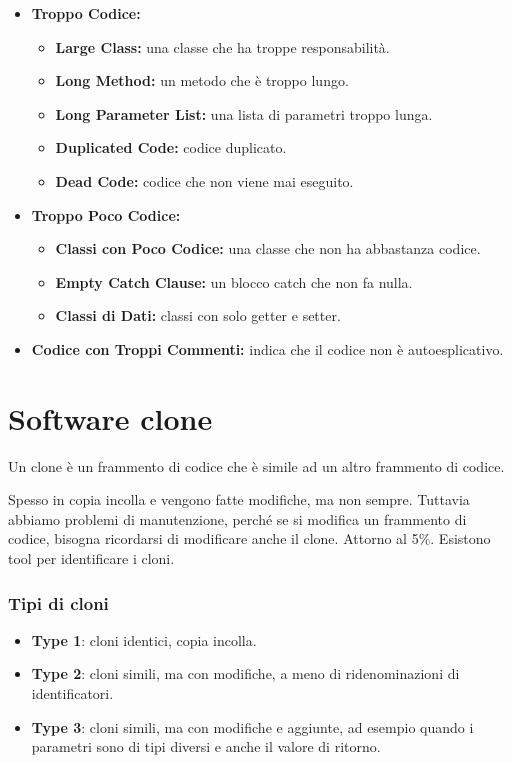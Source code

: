 \begin{itemize}
    \item \textbf{Troppo Codice:}
    \begin{itemize}
        \item \textbf{Large Class:} una classe che ha troppe responsabilità.
        \item \textbf{Long Method:} un metodo che è troppo lungo.
        \item \textbf{Long Parameter List:} una lista di parametri troppo lunga.
        \item \textbf{Duplicated Code:} codice duplicato.
        \item \textbf{Dead Code:} codice che non viene mai eseguito.
    \end{itemize}
    \item \textbf{Troppo Poco Codice:}
    \begin{itemize}
        \item \textbf{Classi con Poco Codice:} una classe che non ha abbastanza
        codice.
        \item \textbf{Empty Catch Clause:} un blocco catch che non fa nulla.
        \item \textbf{Classi di Dati:} classi con solo getter e setter.
    \end{itemize}
    \item \textbf{Codice con Troppi Commenti:} indica che il codice non è
    autoesplicativo.
\end{itemize}
\section{Software clone}
\begin{tcolorbox}[title = Clone]
    Un clone è un frammento di codice che è simile ad un altro frammento
    di codice.
\end{tcolorbox}
Spesso in copia incolla e vengono fatte modifiche, ma non sempre. Tuttavia 
abbiamo problemi di manutenzione, perché se si modifica un frammento
di codice, bisogna ricordarsi di modificare anche il clone. Attorno 
al 5\%. Esistono tool per identificare i cloni.
\subsubsection{Tipi di cloni}
\begin{itemize}
    \item \textbf{Type 1}: cloni identici, copia incolla.
    \item \textbf{Type 2}: cloni simili, ma con modifiche, a meno di 
    ridenominazioni di identificatori.
    \item \textbf{Type 3}: cloni simili, ma con modifiche e aggiunte, 
    ad esempio quando i parametri sono di tipi diversi e anche il valore 
    di ritorno.
\end{itemize}
